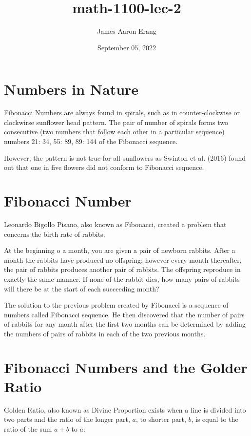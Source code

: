 \documentclass[12pt, UTF8]{article}
\title{math-1100-lec-2}
\author{James Aaron Erang}
\date{September 05, 2022}
\begin{document}
	\maketitle
	
	\section*{Numbers in Nature}
	
	Fibonacci Numbers are always found in spirals, such as in counter-clockwise or clockwirse sunflower head pattern. The pair of number of spirals forms two consecutive (two numbers that follow each other in a particular sequence) numbers {21: 34, 55: 89, 89: 144} of the Fibonacci sequence.
	
	However, the pattern is not true for all sunflowers as Swinton et al. (2016) found out that one in five flowers did not conform to Fibonacci sequence.
	
	\section{Fibonacci Number}
	
	Leonardo Bigollo Pisano, also known as Fibonacci, created a problem that concerns the birth rate of rabbits.
	
	\begin{displayquote}
		At the beginning o a month, you are given a pair of newborn rabbits. After a month the rabbits have produced no offspring; however every month thereafter, the pair of rabbits produces another pair of rabbits. The offspring reproduce in exactly the same manner. If none of the rabbit dies, how many pairs of rabbits will there be at the start of each succeeding month?
	\end{displayquote}
	
	The solution to the previous problem created by Fibonacci is a sequence of numbers called Fibonacci sequence. He then discovered that the number of pairs of rabbits for any month after the first two months can be determined by adding the numbers of pairs of rabbits in each of the two previous months.
	
	\section{Fibonacci Numbers and the Golder Ratio}
	
	Golden Ratio, also known as Divine Proportion exists when a line is divided into two parts and the ratio of the longer part, $a$, to shorter part, $b$, is equal to the ratio of the sum $a+b$ to $a$:
	
\end{document}

